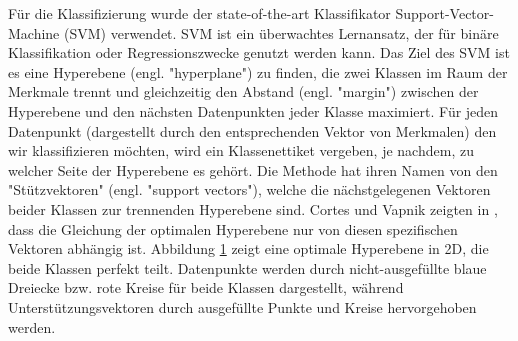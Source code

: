 Für die Klassifizierung wurde der state-of-the-art Klassifikator Support-Vector-Machine (SVM) verwendet.
SVM ist ein überwachtes Lernansatz, der für binäre Klassifikation oder Regressionszwecke genutzt werden kann. 
Das Ziel des SVM ist es eine Hyperebene (engl. "hyperplane") zu finden, die zwei Klassen im Raum der Merkmale trennt und gleichzeitig den Abstand (engl. "margin") zwischen der Hyperebene und den nächsten Datenpunkten jeder Klasse maximiert.
Für jeden Datenpunkt (dargestellt durch den entsprechenden Vektor von Merkmalen) den wir klassifizieren möchten, wird ein Klassenettiket vergeben, je nachdem, zu welcher Seite der Hyperebene es gehört.
Die Methode hat ihren Namen von den "Stützvektoren" (engl. "support vectors"), welche die nächstgelegenen Vektoren beider Klassen zur trennenden Hyperebene sind. 
Cortes und Vapnik zeigten in \cite{svn1995}, dass die Gleichung der optimalen Hyperebene nur von diesen spezifischen Vektoren abhängig ist.
Abbildung \ref{fig:svm} zeigt eine optimale Hyperebene in 2D, die beide Klassen perfekt teilt.
Datenpunkte werden durch nicht-ausgefüllte blaue Dreiecke bzw. rote Kreise für beide Klassen dargestellt, während Unterstützungsvektoren durch ausgefüllte Punkte und Kreise hervorgehoben werden. \\

\begin{figure}[h] 
\label{fig:svm} 
\end{figure} \vspace{0.5cm}


